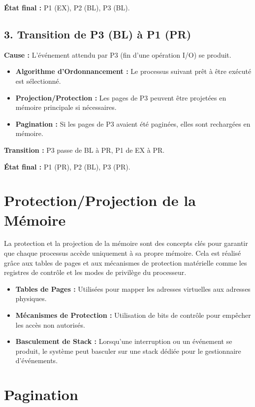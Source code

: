 \textbf{État final :} P1 (EX), P2 (BL), P3 (BL).

\subsection*{3. Transition de P3 (BL) à P1 (PR)}

\textbf{Cause :} L'événement attendu par P3 (fin d'une opération I/O) se produit.

\begin{itemize}
    \item \textbf{Algorithme d'Ordonnancement :} Le processus suivant prêt à être exécuté est sélectionné.
    \item \textbf{Projection/Protection :} Les pages de P3 peuvent être projetées en mémoire principale si nécessaires.
    \item \textbf{Pagination :} Si les pages de P3 avaient été paginées, elles sont rechargées en mémoire.
\end{itemize}

\textbf{Transition :} P3 passe de BL à PR, P1 de EX à PR.

\textbf{État final :} P1 (PR), P2 (BL), P3 (PR).

\section*{Protection/Projection de la Mémoire}

La protection et la projection de la mémoire sont des concepts clés pour garantir que chaque processus accède uniquement à sa propre mémoire. Cela est réalisé grâce aux tables de pages et aux mécanismes de protection matérielle comme les registres de contrôle et les modes de privilège du processeur.

\begin{itemize}
    \item \textbf{Tables de Pages :} Utilisées pour mapper les adresses virtuelles aux adresses physiques.
    \item \textbf{Mécanismes de Protection :} Utilisation de bits de contrôle pour empêcher les accès non autorisés.
    \item \textbf{Basculement de Stack :} Lorsqu'une interruption ou un événement se produit, le système peut basculer sur une stack dédiée pour le gestionnaire d'événements.
\end{itemize}

\section*{Pagination}

